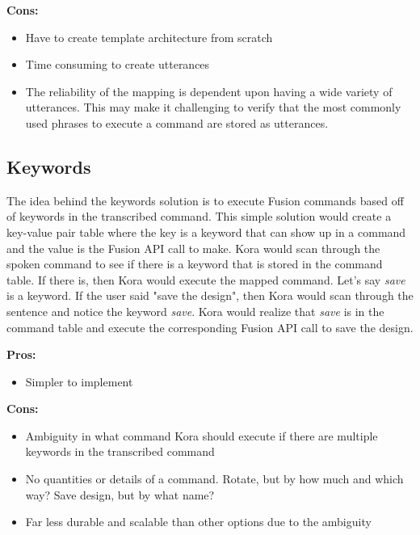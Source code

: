 \documentclass[onecolumn, draftclsnofoot,10pt, compsoc]{IEEEtran}
\begin{document}
				\textbf{Cons:}
					\begin{itemize}
						\item{
							Have to create template architecture from scratch}
						\item{
							Time consuming to create utterances}
						\item{
							The reliability of the mapping is dependent upon having a wide variety of utterances.
							This may make it challenging to verify that the most commonly used phrases to execute a command are stored as utterances.}
					\end{itemize}
				
				
				
				\subsection{Keywords}
					The idea behind the keywords solution is to execute Fusion commands based off of keywords in the transcribed command. 
					This simple solution would create a key-value pair table where the key is a keyword that can show up in a command and the value is the Fusion API call to make.
					Kora would scan through the spoken command to see if there is a keyword that is stored in the command table.
					If there is, then Kora would execute the mapped command.
					Let's say \textit{save} is a keyword. 
					If the user said "save the design", then Kora would scan through the sentence and notice the keyword \textit{save}.
					Kora would realize that \textit{save} is in the command table and execute the corresponding Fusion API call to save the design.
				
					\textbf{Pros:}
						\begin{itemize}
							\item{
								Simpler to implement}
						\end{itemize}
					
					\textbf{Cons:}
						\begin{itemize}
							\item{
								Ambiguity in what command Kora should execute if there are multiple keywords in the transcribed command}
							\item{
								No quantities or details of a command. Rotate, but by how much and which way? Save design, but by what name? }
							\item{
								Far less durable and scalable than other options due to the ambiguity}
						\end{itemize}
				
\end{document}
